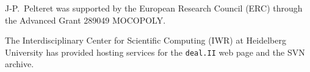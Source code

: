 \documentclass{ansarticle-preprint}
\newcommand{\specialword}[1]{\texttt{#1}}
\newcommand{\dealii}{{\specialword{deal.II}}}
\begin{document}
J-P.~Pelteret was supported by the European Research Council (ERC) through the Advanced Grant 289049 MOCOPOLY.

The Interdisciplinary Center for Scientific Computing (IWR) at Heidelberg University has provided
hosting services for the \dealii{} web page and the SVN archive.


{}

\end{document}
